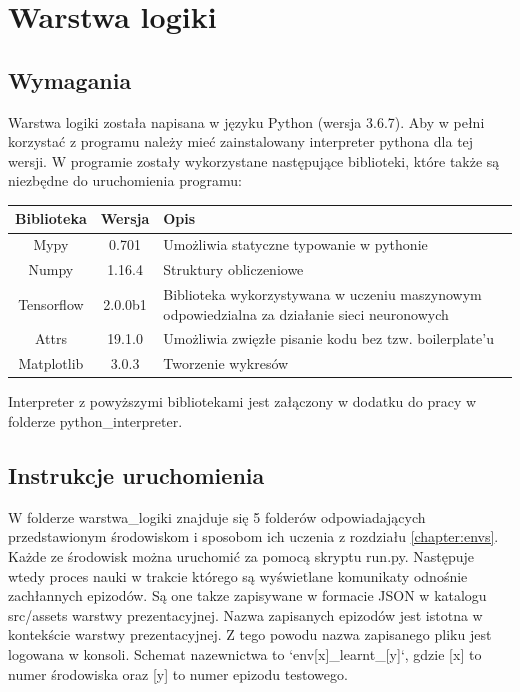 \documentclass[12pt]{book}
\theoremstyle{plain}
\begin{document}
\section{Warstwa logiki}
\subsection{Wymagania}
Warstwa logiki została napisana w języku Python (wersja 3.6.7). Aby w pełni korzystać z programu należy mieć zainstalowany interpreter pythona dla tej wersji. W programie zostały wykorzystane następujące biblioteki, które także są niezbędne do uruchomienia programu: \newline \newline
\renewcommand{\arraystretch}{1.3}
\begin{tabular}{| c | c | L{5cm} |}
	\hline
	Biblioteka   &  Wersja & Opis \\	\hline
	Mypy & 0.701 & Umożliwia statyczne typowanie w pythonie \\ \hline
	Numpy & 1.16.4 & Struktury obliczeniowe \\ \hline
	Tensorflow & 2.0.0b1 &  Biblioteka wykorzystywana w uczeniu maszynowym odpowiedzialna za działanie sieci neuronowych \\ \hline
	Attrs & 19.1.0 & Umożliwia zwięzłe pisanie kodu bez tzw. boilerplate'u \\ \hline
	Matplotlib & 3.0.3 & Tworzenie wykresów \\ \hline
\end{tabular}\newline \newline
Interpreter z powyższymi bibliotekami jest załączony w dodatku do pracy w folderze python\_interpreter.
\subsection{Instrukcje uruchomienia}
W folderze warstwa\_logiki znajduje się 5 folderów odpowiadających przedstawionym środowiskom i sposobom ich uczenia z rozdziału \ref{chapter:envs}. Każde ze środowisk można uruchomić za pomocą skryptu run.py. Następuje wtedy proces nauki w trakcie którego są wyświetlane komunikaty odnośnie zachłannych epizodów. Są one takze zapisywane w formacie JSON w katalogu src/assets warstwy prezentacyjnej. Nazwa zapisanych epizodów jest istotna w kontekście warstwy prezentacyjnej. Z tego powodu nazwa zapisanego pliku jest logowana w konsoli. Schemat nazewnictwa to `env[x]\_learnt\_[y]`, gdzie [x] to numer środowiska oraz [y] to numer epizodu testowego.
\end{document}
